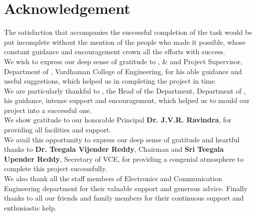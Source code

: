 
{}
\chapter*{Acknowledgement}


The satisfaction that accompanies the successful completion of the task would be put incomplete without the mention of the people who made it possible, whose constant guidance and encouragement crown all the efforts with success.\\

We wish to express our deep sense of gratitude to \textbf{\guidename}, \guidedesignation & and Project Supervisor, Department of \thesisdept, Vardhaman College of Engineering, for his able guidance and useful suggestions, which helped us in completing the project in time.\\

We are particularly thankful to \textbf{\depthodname}, the Head of the Department, Department of \thesisdept, his guidance, intense support and
encouragement, which helped us to mould our project into a successful one.\\

We show gratitude to our honorable Principal \textbf{Dr. J.V.R. Ravindra}, for providing all facilities and support.\\

We avail this opportunity to express our deep sense of gratitude and heartful thanks to \textbf {Dr. Teegala Vijender Reddy}, Chairman and \textbf {Sri Teegala Upender Reddy}, Secretary of VCE, for providing a congenial atmosphere to complete this project successfully.\\

We also thank all the staff members of Electronics and Communication Engineering department for their valuable support and generous advice. Finally thanks to all our friends and family members for their continuous support and enthusiastic help.
\begin{flushright} 

\textbf{\studentA}\\ [0.075in]
\textbf{\studentB}\\ [0.075in]
\textbf{\studentC}\\

\end{flushright}
